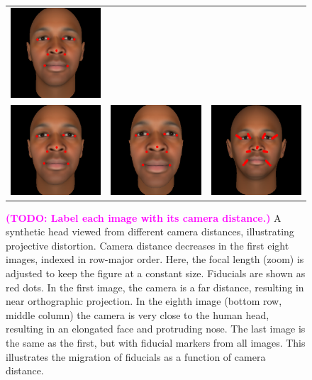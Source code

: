 \documentclass[runningheads]{llncs}
\newcommand {\ericnote} [1] {{\bf \textcolor{magenta}{(#1)}}}
\begin{document}
\begin{figure}[ht!]
\begin{tabular}{ccc}
\includegraphics[width=.33\linewidth]{resources/figures/extracted_fiducial_0004.png} \\
\includegraphics[width=.33\linewidth]{resources/figures/extracted_fiducial_0005.png} &
\includegraphics[width=.33\linewidth]{resources/figures/extracted_fiducial_0007.png} &
\includegraphics[width=.33\linewidth]{resources/figures/fiducial_migration.png}
\end{tabular}
\caption{
\ericnote{TODO: Label each image with its camera distance.}
A synthetic head viewed from different camera distances, illustrating projective distortion.
Camera distance decreases in the first eight images, indexed in row-major order.
Here, the focal length (zoom) is adjusted to keep the figure at a constant size.
Fiducials are shown as red dots.
In the first image, the camera is a far distance, resulting in near orthographic projection.
In the eighth image (bottom row, middle column) the camera is very close to the human head, resulting in an elongated face and protruding nose.  
The last image is the same as the first, but with fiducial markers from all images.
This illustrates the migration of fiducials as a function of camera distance. 
} 
\label{fig:fiducial_migration}
\end{figure}
\end{document}
